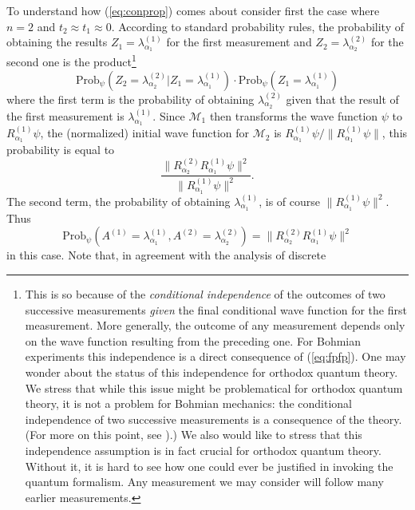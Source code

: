 \documentclass[12pt]{article}
\newcommand{\BM}{Bohmian mechanics}
\newcommand{\wf}{wave function}
\newcommand{\cwf}{conditional wave function}
\newcommand{\M}{\mbox{$\mathcal{M}$}}
\newcommand{\prob}{\mbox{Prob}_{\psi}}
\newcommand{\norm}{\|}
\newcommand{\oqt}{orthodox quantum theory}
\begin{document}
To understand how (\ref{eq:conprop}) comes about consider first the
case where $n=2$ and $t_2\approx t_1\approx 0$.  According to standard
probability rules, the probability of obtaining the results
$Z_{1}=\lambda^{(1)}_{\alpha_{1}}$ for the first measurement and
$Z_{2}=\lambda^{(2)}_{\alpha_{2}}$ for the second one is the
product\footnote{This is so because of the \textit{conditional
     independence} of the outcomes of two successive measurements
   \textit{given} the final \cwf{} for the first measurement.  More
   generally, the outcome of any measurement depends only on the \wf{}
   resulting {}from the preceding one.  For Bohmian experiments this
   independence is a direct consequence of (\ref{eq:fpfp}).  One may
   wonder about the status of this independence for \oqt{}.  We stress
   that while this issue might be problematical for \oqt{}, it is not a
   problem for \BM: the conditional independence of two successive
   measurements is a consequence of the theory. (For more on this
   point, see \cite{DGZ92a}).) We also would like to stress that this
   independence assumption is in fact crucial for \oqt{}.  Without it,
   it is hard to see how one could ever be justified in invoking the
   quantum formalism. Any measurement we may consider will follow many
   earlier measurements.}
%
\begin{displaymath}
\prob (Z_{2}= \lambda^{(2)}_{\alpha_{2}}| Z_{1} =
\lambda^{(1)}_{\alpha_{1}}) \cdot
\prob(Z_{1}=\lambda^{(1)}_{\alpha_{1}})
\end{displaymath}
%
where the first term is the probability of obtaining
$\lambda^{(2)}_{\alpha_{2}}$ given that the result of the first
measurement is $\lambda^{(1)}_{\alpha_{1}}$.  Since $\M_1$ then
transforms the \wf{} $\psi$ to $R^{(1)}_{\alpha_{1}}\psi$, the
(normalized) initial \wf{} for $\M_2$ is
${R^{(1)}_{\alpha_{1}}\psi}/{\|R^{(1)}_{\alpha_{1}}\psi\| }$, this
probability is equal to
\begin{displaymath}
\frac{\norm
R^{(2)}_{\alpha_{2}} R^{(1)}_{\alpha_{1}}\psi\norm^2}{\norm
R^{(1)}_{\alpha_{1}}\psi\norm^2}.
\end{displaymath}
The second term, the probability of obtaining
$\lambda^{(1)}_{\alpha_{1}}$, is of course $\norm R^{(1)}_{\alpha_{1}}
\psi\norm^2 $.  Thus
%
\begin{displaymath}
\prob(A^{(1)}=\lambda^{(1)}_{\alpha_{1}},A^{(2)}=
\lambda^{(2)}_{\alpha_{2}}) =\| R^{(2)}_{\alpha_{2}}
R^{(1)}_{\alpha_{1}}\psi\|^{2}
\end{displaymath}
%
in this case.  Note that, in agreement with the analysis of discrete
\end{document}
